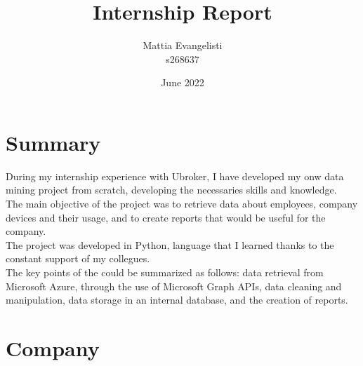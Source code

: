 \documentclass[12pt, a4paper, twoside]{article}
\title{\huge Internship Report}
\author{Mattia Evangelisti \\ s268637}
\date{June 2022}
\begin{document}
\begin{titlepage}
    \maketitle
\end{titlepage}

\tableofcontents
\clearpage\null\newpage

\newpage
\section{Summary}
During my internship experience with Ubroker, I have developed my onw data mining project from scratch, developing the necessaries skills and knowledge.\\
The main objective of the project was to retrieve data about employees, company devices and their usage, and to create reports that would be useful for the company.\\
The project was developed in Python, language that I learned thanks to the constant support of my collegues.\\
The key points of the could be summarized as follows: data retrieval from Microsoft Azure, through the use of Microsoft Graph APIs, data cleaning and manipulation, data storage in an internal database,
and the creation of reports.\\

\section{Company}
\end{document}
